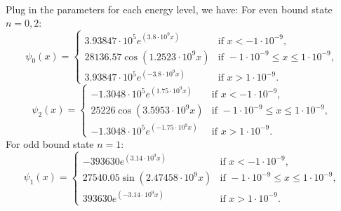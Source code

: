 \documentclass{article}
\begin{document}
\\
Plug in the parameters for each energy level, we have:
For even bound state \(n = 0, 2\):
\begin{equation}
    \psi_0(x) =
    \begin{cases}
        3.93847 \cdot 10^5 e^{(3.8 \cdot 10^9 x)} & \text{if } x < -1 \cdot 10^{-9},\\
        28136.57 \cos(1.2523 \cdot 10^9 x) & \text{if } -1 \cdot 10^{-9} \leq x \leq 1 \cdot 10^{-9},\\
        3.93847 \cdot 10^5 e^{(-3.8 \cdot 10^9 x)} & \text{if } x > 1 \cdot 10^{-9}.
    \end{cases}
\end{equation}
\begin{equation}
    \psi_2(x) =
    \begin{cases}
        -1.3048 \cdot 10^5 e^{(1.75 \cdot 10^9 x)} & \text{if } x < -1 \cdot 10^{-9},\\
        25226 \cos(3.5953 \cdot 10^9 x) & \text{if } -1 \cdot 10^{-9} \leq x \leq 1 \cdot 10^{-9},\\
        -1.3048 \cdot 10^5 e^{(-1.75 \cdot 10^9 x)} & \text{if } x > 1 \cdot 10^{-9}.
    \end{cases}
\end{equation}
For odd bound state \(n = 1\):
\begin{equation}
    \psi_1(x) =
    \begin{cases}
        -393630e^{(3.14 \cdot 10^9 x)} & \text{if } x < -1 \cdot 10^{-9},\\
        27540.05 \sin(2.47458 \cdot 10^9 x) & \text{if } -1 \cdot 10^{-9} \leq x \leq 1 \cdot 10^{-9},\\
        393630e^{(-3.14 \cdot 10^9 x)} & \text{if } x > 1 \cdot 10^{-9}.
    \end{cases}
\end{equation}
\begin{figure}[H]
    \centering
\end{figure}
\end{document}
